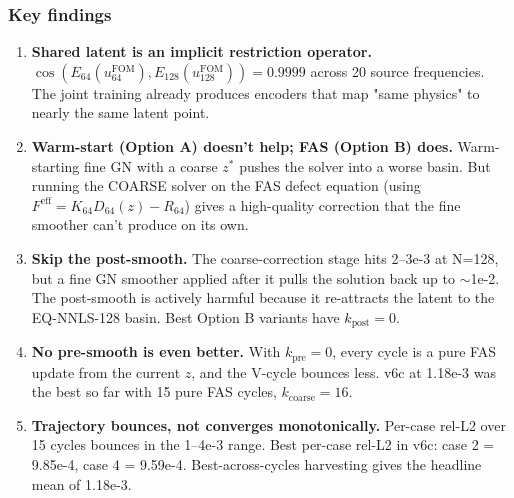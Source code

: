 \subsubsection*{Key findings}

\begin{enumerate}
  \item \textbf{Shared latent is an implicit restriction operator.}
        $\cos(E_{64}(u_{64}^{\text{FOM}}), E_{128}(u_{128}^{\text{FOM}})) = 0.9999$
        across 20 source frequencies. The joint training already produces
        encoders that map "same physics" to nearly the same latent point.
  \item \textbf{Warm-start (Option A) doesn't help; FAS (Option B) does.}
        Warm-starting fine GN with a coarse $z^\ast$ pushes the solver
        into a worse basin. But running the COARSE solver on the FAS
        defect equation (using $F^{\text{eff}} = K_{64} D_{64}(z) - R_{64}$)
        gives a high-quality correction that the fine smoother can't
        produce on its own.
  \item \textbf{Skip the post-smooth.} The coarse-correction stage hits
        2--3e-3 at N=128, but a fine GN smoother applied after it pulls
        the solution back up to $\sim$1e-2. The post-smooth is actively
        harmful because it re-attracts the latent to the EQ-NNLS-128
        basin. Best Option B variants have $k_{\text{post}} = 0$.
  \item \textbf{No pre-smooth is even better.} With $k_{\text{pre}} = 0$,
        every cycle is a pure FAS update from the current $z$, and the
        V-cycle bounces less. v6c at 1.18e-3 was the best so far with
        15 pure FAS cycles, $k_{\text{coarse}} = 16$.
  \item \textbf{Trajectory bounces, not converges monotonically.} Per-case
        rel-L2 over 15 cycles bounces in the 1--4e-3 range. Best
        per-case rel-L2 in v6c: case 2 = 9.85e-4, case 4 = 9.59e-4.
        Best-across-cycles harvesting gives the headline mean of 1.18e-3.
\end{enumerate}


